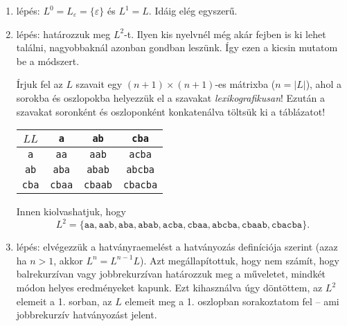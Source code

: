 \documentclass[a4paper,11pt]{article}
\newcommand{\emptyword}{\varepsilon}
\begin{document}
	\begin{enumerate}
		\item lépés: $L^0 = L_\emptyword = \{ \emptyword \}$ és $L^1 = L$. Idáig elég egyszerű.
		\item lépés: határozzuk meg $L^2$-t. Ilyen kis nyelvnél még akár fejben is ki lehet találni, nagyobbaknál azonban gondban leszünk. Így ezen a kicsin mutatom be a módszert.
		
		Írjuk fel az $L$ szavait egy $(n+1) \times (n+1)$-es mátrixba ($n = |L|$), ahol a sorokba és oszlopokba helyezzük el a szavakat \textit{lexikografikusan}! Ezután a szavakat soronként és oszloponként konkatenálva töltsük ki a táblázatot!
		\begin{center}
			\begin{tabular}{|c|c|c|c|}
				\hline
				$LL$ & \texttt{a} & \texttt{ab}  & \texttt{cba}  \\
				\hline
				\texttt{a} & \texttt{aa} & \texttt{aab} & \texttt{acba}  \\
				\hline
				\texttt{ab} & \texttt{aba} & \texttt{abab} & \texttt{abcba}  \\
				\hline
				\texttt{cba} & \texttt{cbaa} & \texttt{cbaab} & \texttt{cbacba} \\
				\hline
			\end{tabular}
		\end{center}
		Innen kiolvashatjuk, hogy \[ L^2 = \{ \texttt{aa}, \texttt{aab}, \texttt{aba}, \texttt{abab}, \texttt{acba}, \texttt{cbaa}, \texttt{abcba}, \texttt{cbaab}, \texttt{cbacba} \}. \]
		\item lépés: elvégezzük a hatványraemelést a hatványozás definíciója szerint (azaz ha $n > 1$, akkor $L^n = L^{n-1}L$). Azt megállapítottuk, hogy nem számít, hogy balrekurzívan vagy jobbrekurzívan határozzuk meg a műveletet, mindkét módon helyes eredményeket kapunk. Ezt kihasználva úgy döntöttem, az $L^2$ elemeit a 1. sorban, az $L$ elemeit meg a 1. oszlopban sorakoztatom fel -- ami jobbrekurzív hatványozást jelent.
	\end{enumerate}
\end{document}
